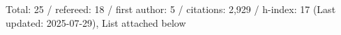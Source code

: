 Total: 25 / refereed: 18 / first author: 5 / citations: 2,929 / h-index: 17 (Last updated: 2025-07-29), List attached below
